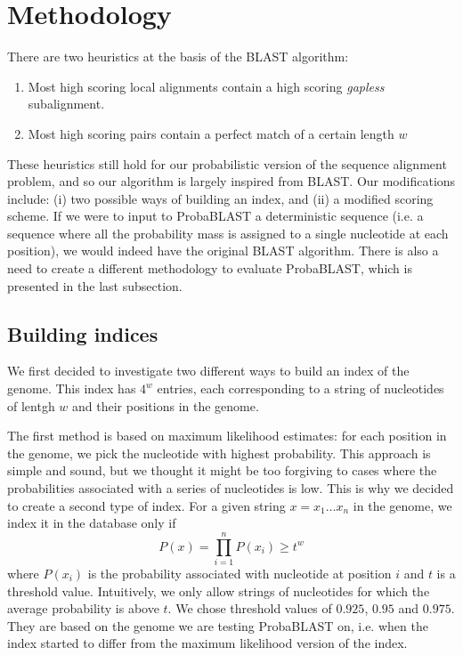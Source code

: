 \documentclass[12pt]{IEEEtran}
\begin{document}
\section{Methodology}

There are two heuristics at the basis of the BLAST algorithm:
\begin{enumerate}
\item Most high scoring local alignments contain a high scoring \emph{gapless} subalignment.
\item Most high scoring pairs contain a perfect match of a certain length $w$
\end{enumerate}
These heuristics still hold for our probabilistic version of the sequence alignment problem, and so our algorithm is largely inspired from BLAST. Our modifications include: (i) two possible ways of building an index, and (ii) a modified scoring scheme. If we were to input to ProbaBLAST a deterministic sequence (i.e. a sequence where all the probability mass is assigned to a single nucleotide at each position), we would indeed have the original BLAST algorithm. There is also a need to create a different methodology to evaluate ProbaBLAST, which is presented in the last subsection.

\subsection{Building indices}

We first decided to investigate two different ways to build an index of the genome. This index has $4^w$ entries, each corresponding to a string of nucleotides of lentgh $w$ and their positions in the genome.

The first method is based on maximum likelihood estimates: for each position in the genome, we pick the nucleotide with highest probability. This approach is simple and sound, but we thought it might be too forgiving to cases where the probabilities associated with a series of nucleotides is low.
This is why we decided to create a second type of index. For a given string $x=x_1\dots x_n$ in the genome, we index it in the database only if 
$$P(x)=\prod_{i=1}^{n}P(x_i)\geq t^w$$
where $P(x_i)$ is the probability associated with nucleotide at position $i$  and $t$ is a threshold value. Intuitively, we only allow strings of nucleotides for which the average probability is above $t$. We chose threshold values of $0.925$, $0.95$ and $0.975$. They are based on the genome we are testing ProbaBLAST on, i.e. when the index started to differ from the maximum likelihood version of the index.
\end{document}
